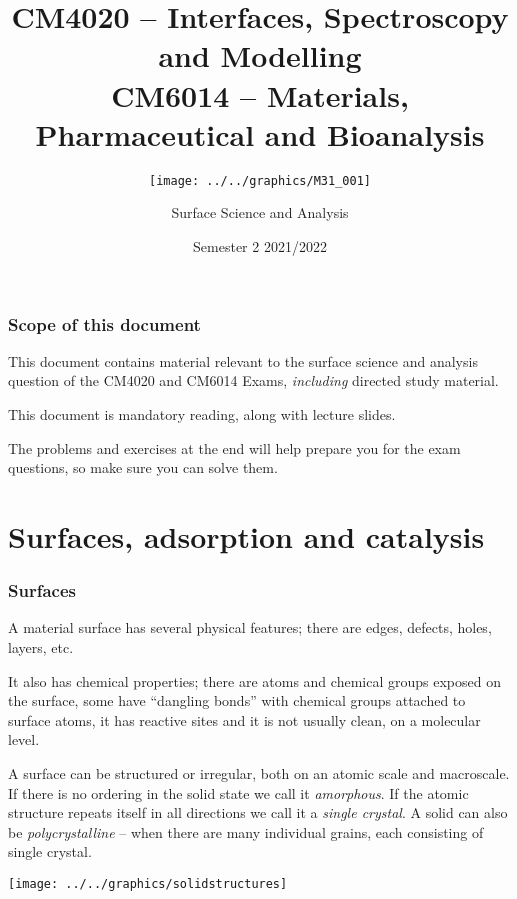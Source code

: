 \documentclass[ignorenonframetext]{beamer}
\title{CM4020 -- Interfaces, Spectroscopy and Modelling\\
CM6014 -- Materials, Pharmaceutical and Bioanalysis}
\subtitle{\vspace{1in}\texttt{[image: ../../graphics/M31\_001]}}
\author{Surface Science and Analysis \mode<article>{\vspace{1cm}\\\texttt{[image: ../../graphics/crac]}}}
\institute{School of Chemistry \\ University College Cork}
\date{Semester 2 2021/2022}
\begin{document}

\begin{frame}
	\titlepage
\end{frame}

\newpage

\section*{Scope of this document}
This document contains material relevant to the surface science and analysis question of the CM4020 and CM6014 Exams, \emph{including} directed study material. 

This document is mandatory reading, along with lecture slides. 

The problems and exercises at the end will help prepare you for the exam questions, so make sure you can solve them.

\part{Surfaces, adsorption and catalysis}


\section{Surfaces}

\begin{frame}
A material surface has several physical features; there are edges, defects, holes, layers, etc.

It also has chemical properties; there are atoms and chemical groups exposed on the surface, some have ``dangling bonds'' with chemical groups attached to surface atoms, it has reactive sites and it is not usually clean, on a molecular level. 

A surface can be structured or irregular, both on an atomic scale and macroscale.
If there is no ordering in the solid state we call it \textit{amorphous}. If the atomic structure repeats itself in all directions we call it a \textit{single crystal}. A solid can also be \textit{polycrystalline} -- when there are many individual grains, each consisting of single crystal.

\begin{center} \texttt{[image: ../../graphics/solidstructures]} \end{center}
\end{frame} 
\end{document}
